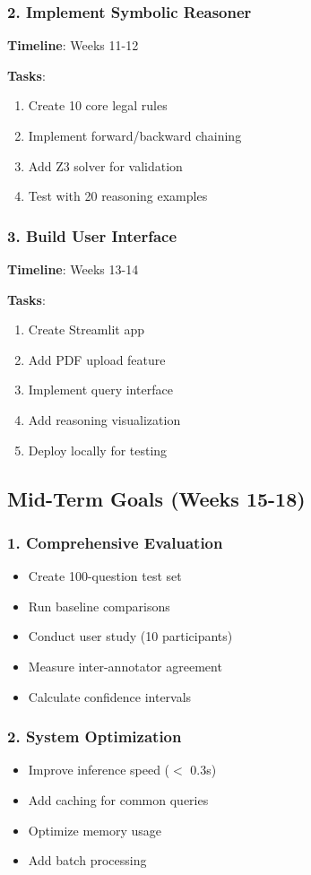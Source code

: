 \documentclass[12pt,a4paper]{article}
\begin{document}
\subsubsection{2. Implement Symbolic Reasoner}
\textbf{Timeline}: Weeks 11-12

\textbf{Tasks}:
\begin{enumerate}
    \item Create 10 core legal rules
    \item Implement forward/backward chaining
    \item Add Z3 solver for validation
    \item Test with 20 reasoning examples
\end{enumerate}

\subsubsection{3. Build User Interface}
\textbf{Timeline}: Weeks 13-14

\textbf{Tasks}:
\begin{enumerate}
    \item Create Streamlit app
    \item Add PDF upload feature
    \item Implement query interface
    \item Add reasoning visualization
    \item Deploy locally for testing
\end{enumerate}

\subsection{Mid-Term Goals (Weeks 15-18)}

\subsubsection{1. Comprehensive Evaluation}
\begin{itemize}
    \item Create 100-question test set
    \item Run baseline comparisons
    \item Conduct user study (10 participants)
    \item Measure inter-annotator agreement
    \item Calculate confidence intervals
\end{itemize}

\subsubsection{2. System Optimization}
\begin{itemize}
    \item Improve inference speed ($<$ 0.3s)
    \item Add caching for common queries
    \item Optimize memory usage
    \item Add batch processing
\end{itemize}
\end{document}
